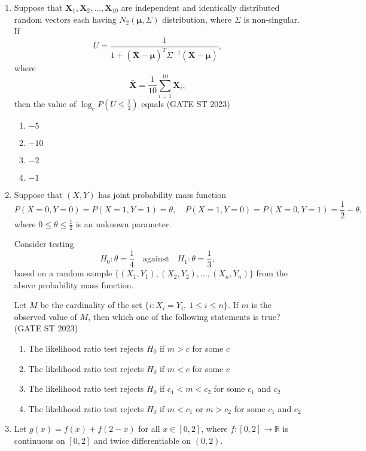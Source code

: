 \documentclass[journal]{IEEEtran}
\begin{document}
\begin{enumerate}[label=\textbf{Q.\arabic*.}, start=1, align=left, itemsep=2em]
\begin{enumerate}[label=\textbf{Q.\arabic*.}, start=11, align=left, itemsep=2em]
\item Suppose that $\mathbf{X}_1, \mathbf{X}_2, \dots, \mathbf{X}_{10}$ are independent and identically distributed random 
vectors each having $N_2(\boldsymbol{\mu}, \Sigma)$ distribution, where $\Sigma$ is non-singular.  
If  
\[
U = \frac{1}{1 + (\bar{\mathbf{X}} - \boldsymbol{\mu})^{T} \Sigma^{-1} (\bar{\mathbf{X}} - \boldsymbol{\mu})},
\]
where  
\[
\bar{\mathbf{X}} = \frac{1}{10} \sum_{i=1}^{10} \mathbf{X}_i,
\]
then the value of $\log_e P\left(U \le \frac{1}{2}\right)$ equals  \hfill(GATE ST 2023)

\begin{enumerate}[label=(\Alph*)]
    \item $-5$
    \item $-10$
    \item $-2$
    \item $-1$
\end{enumerate}


\item Suppose that $(X, Y)$ has joint probability mass function
\[
P(X = 0, Y = 0) = P(X = 1, Y = 1) = \theta, \quad
P(X = 1, Y = 0) = P(X = 0, Y = 1) = \frac12 - \theta,
\]
where $0 \le \theta \le \frac12$ is an unknown parameter.  

Consider testing  
\[
H_0: \theta = \frac14 \quad \text{against} \quad H_1: \theta = \frac13,
\]
based on a random sample $\{(X_1, Y_1), (X_2, Y_2), \dots, (X_n, Y_n)\}$ from the above probability mass function.  

Let $M$ be the cardinality of the set $\{ i : X_i = Y_i, \ 1 \le i \le n \}$.  
If $m$ is the observed value of $M$, then which one of the following statements is true? \hfill(GATE ST 2023) 

\begin{enumerate}[label=(\Alph*)]
    \item The likelihood ratio test rejects $H_0$ if $m > c$ for some $c$
    \item The likelihood ratio test rejects $H_0$ if $m < c$ for some $c$
    \item The likelihood ratio test rejects $H_0$ if $c_1 < m < c_2$ for some $c_1$ and $c_2$
    \item The likelihood ratio test rejects $H_0$ if $m < c_1$ or $m > c_2$ for some $c_1$ and $c_2$
\end{enumerate}

\vspace{0.4cm}

\item Let $g(x) = f(x) + f(2 - x)$ for all $x \in [0, 2]$, where $f: [0, 2] \to \mathbb{R}$ is continuous on $[0, 2]$ and twice differentiable on $(0, 2)$.  


\end{enumerate}
\end{enumerate}
\end{document}
